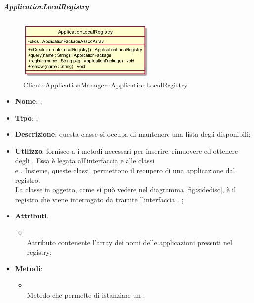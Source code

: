 \hypertarget{ApplicationLocalRegistry_label}{\subparagraph{ApplicationLocalRegistry}}
\begin{figure}[h]
	\centering
	\includegraphics[width=0.60\textwidth,height=\textheight,keepaspectratio]{images/ClassApplicationLocalRegistry.png}
	\caption{Client::ApplicationManager::ApplicationLocalRegistry}
\end{figure}
\begin{itemize}
	\item \textbf{Nome}: ;
	\item \textbf{Tipo}: ;
	\item \textbf{Descrizione}: questa classe si occupa di mantenere una lista degli  disponibili;
	\item \textbf{Utilizzo}: fornisce a  i metodi necessari per inserire, rimuovere ed ottenere degli .
Essa è legata all'interfaccia  e alle classi \\  e . Insieme, queste classi, permettono il recupero di una applicazione dal registro. \\
La classe in oggetto, come si può vedere nel diagramma \ref{fig:sidedisc}, è il registro che viene interrogato da  tramite l'interfaccia .
;
	\item \textbf{Attributi}:
	\begin{itemize}
		\item[]  \\
		Attributo contenente l'array dei nomi delle applicazioni presenti nel registry;
	\end{itemize}
	\item \textbf{Metodi}:
	\begin{itemize}
		\item[]  \\		Metodo che permette di istanziare un ;\\

\end{itemize}
\end{itemize}
